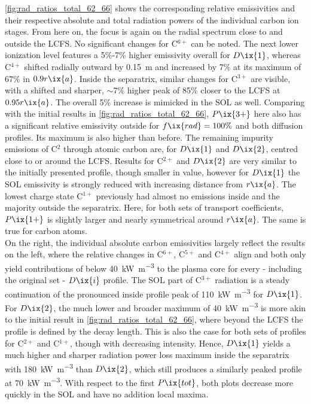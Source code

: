 %
                \cref{fig:rad_ratios_total_62_66} shows the corresponding relative emissivities and their respective absolute and total radiation powers of the individual carbon ion stages. From here on, the focus is again on the radial spectrum close to and outside the LCFS. No significant changes for C$^{6+}$ can be noted. The next lower ionization level features a 5\%-7\% higher emissivity overall for $D\ix{1}$, whereas C$^{4+}$ shifted radially outward by \SI{0.15}{\meter} and increased by 7\% at its maximum of 67\% in $0.9r\ix{a}$. Inside the separatrix, similar changes for C$^{3+}$ are visible, with a shifted and sharper, $\sim$7\% higher peak of 85\% closer to the LCFS at $0.95r\ix{a}$. The overall 5\% increase is mimicked in the SOL as well. Comparing with the initial results in \cref{fig:rad_ratios_total_62_66}, $P\ix{3+}$ here also has a significant relative emissivity outside for $f\ix{rad}=100\%$ and both diffusion profiles. Its maximum is also higher than before. The remaining impurity emissions of C$^{2}$ through atomic carbon are, for $D\ix{1}$ and $D\ix{2}$, centred close to or around the LCFS. Results for C$^{2+}$ and $D\ix{2}$ are very similar to the initially presented profile, though smaller in value, however for $D\ix{1}$ the SOL emissivity is strongly reduced with increasing distance from $r\ix{a}$. The lowest charge state C$^{1+}$ previously had almost no emissions inside and the majority outside the separatrix. Here, for both sets of transport coefficients, $P\ix{1+}$ is slightly larger and nearly symmetrical around $r\ix{a}$. The same is true for carbon atoms.\\%
                On the right, the individual absolute carbon emissivities largely reflect the results on the left, where the relative changes in C$^{6+}$, C$^{5+}$ and C$^{4+}$ align and both only yield contributions of below \SI{40}{\kilo\watt\per\cubic\meter} to the plasma core for every - including the original set - $D\ix{i}$ profile. The SOL part of C$^{3+}$ radiation is a steady continuation of the pronounced inside profile peak of \SI{110}{\kilo\watt\per\cubic\meter} for $D\ix{1}$. For $D\ix{2}$, the much lower and broader maximum of \SI{40}{\kilo\watt\per\cubic\meter} is more akin to the initial result in \cref{fig:rad_ratios_total_62_66}, where beyond the LCFS the profile is defined by the decay length. This is also the case for both sets of profiles for C$^{2+}$ and C$^{1+}$, though with decreasing intensity. Hence, $D\ix{1}$ yields a much higher and sharper radiation power loss maximum inside the separatrix with \SI{180}{\kilo\watt\per\cubic\meter} than $D\ix{2}$, which still produces a similarly peaked profile at \SI{70}{\kilo\watt\per\cubic\meter}. With respect to the first $P\ix{tot}$, both plots decrease more quickly in the SOL and have no addition local maxima.\\%
